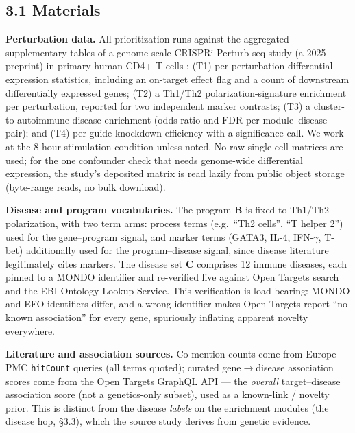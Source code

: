 \subsection*{3.1 Materials}\label{materials}

\noindent \textbf{Perturbation data.} All prioritization runs against the aggregated supplementary tables of a
genome-scale CRISPRi Perturb-seq study (a 2025 preprint) in primary human CD4+ T cells \cite{zhu2025}:
(T1) per-perturbation differential-expression statistics, including an on-target effect flag and a count
of downstream differentially expressed genes; (T2) a Th1/Th2 polarization-signature enrichment per
perturbation, reported for two independent marker contrasts; (T3) a cluster-to-autoimmune-disease
enrichment (odds ratio and FDR per module--disease pair); and (T4) per-guide knockdown efficiency with a
significance call. We work at the 8-hour stimulation condition unless noted. No raw single-cell matrices
are used; for the one confounder check that needs genome-wide differential expression, the study's
deposited matrix is read lazily from public object storage (byte-range reads, no bulk download).

\noindent \textbf{Disease and program vocabularies.} The program \textbf{B} is fixed to Th1/Th2 polarization, with two term
arms: process terms (e.g.~``Th2 cells'', ``T helper 2'') used for the gene--program signal, and marker terms
(GATA3, IL-4, IFN-$\gamma$, T-bet) additionally used for the program--disease signal, since disease literature
legitimately cites markers. The disease set \textbf{C} comprises 12 immune diseases, each pinned to a MONDO
identifier \cite{mondo2022} and re-verified live against Open Targets search and the EBI Ontology Lookup Service. This
verification is load-bearing: MONDO and EFO identifiers differ, and a wrong identifier makes Open Targets
report ``no known association'' for every gene, spuriously inflating apparent novelty everywhere.

\noindent \textbf{Literature and association sources.} Co-mention counts come from Europe PMC \cite{europepmc2015} \texttt{hitCount} queries (all
terms quoted); curated gene$\rightarrow$disease association scores come from the Open Targets GraphQL API \cite{opentargets2023} --- the
\emph{overall} target--disease association score (not a genetics-only subset), used as a known-link / novelty
prior. This is distinct from the disease \emph{labels} on the enrichment modules (the disease hop, \S{}3.3), which
the source study derives from genetic evidence.

